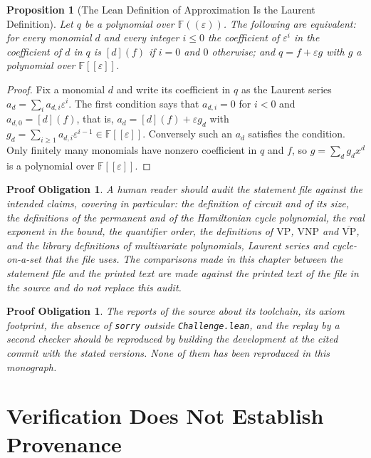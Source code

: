 \documentclass[11pt,letterpaper]{report}
\theoremstyle{plain}
\newtheorem{proposition}[theorem]{Proposition}
\newtheorem{obligation}[theorem]{Proof Obligation}
\theoremstyle{definition}
\theoremstyle{remark}
\newcommand{\VP}{\mathrm{VP}}
\newcommand{\VNP}{\mathrm{VNP}}
\begin{document}
\begin{proposition}[The Lean Definition of Approximation Is the Laurent Definition]\label{pr:approxdef}
Let $q$ be a polynomial over $\mathbb F((\varepsilon))$. The following are equivalent: for every monomial $d$ and every integer $i\le0$ the coefficient of $\varepsilon^i$ in the coefficient of $d$ in $q$ is $[d](f)$ if $i=0$ and $0$ otherwise; and $q=f+\varepsilon g$ with $g$ a polynomial over $\mathbb F[[\varepsilon]]$.
\end{proposition}
\begin{proof}
Fix a monomial $d$ and write its coefficient in $q$ as the Laurent series $a_d=\sum_ia_{d,i}\varepsilon^i$. The first condition says that $a_{d,i}=0$ for $i<0$ and $a_{d,0}=[d](f)$, that is, $a_d=[d](f)+\varepsilon g_d$ with $g_d=\sum_{i\ge1}a_{d,i}\varepsilon^{i-1}\in\mathbb F[[\varepsilon]]$. Conversely such an $a_d$ satisfies the condition. Only finitely many monomials have nonzero coefficient in $q$ and $f$, so $g=\sum_dg_dx^d$ is a polynomial over $\mathbb F[[\varepsilon]]$.
\end{proof}

\begin{obligation}\label{ob:semantic}
A human reader should audit the statement file against the intended claims, covering in particular: the definition of circuit and of its size, the definitions of the permanent and of the Hamiltonian cycle polynomial, the real exponent in the bound, the quantifier order, the definitions of $\VP$, $\VNP$ and $\overline{\VP}$, and the library definitions of multivariate polynomials, Laurent series and cycle-on-a-set that the file uses. The comparisons made in this chapter between the statement file and the printed text are made against the printed text of the file in the source and do not replace this audit.
\end{obligation}

\begin{obligation}\label{ob:rebuild}
The reports of the source about its toolchain, its axiom footprint, the absence of \texttt{sorry} outside \texttt{Challenge.lean}, and the replay by a second checker should be reproduced by building the development at the cited commit with the stated versions. None of them has been reproduced in this monograph.
\end{obligation}

\chapter{Verification Does Not Establish Provenance}
\end{document}
